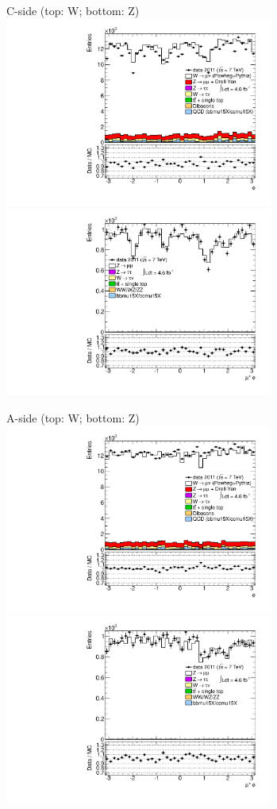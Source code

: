{

\colb[T]

C-side (top: W; bottom: Z)
\centering
\includegraphics[width=0.66\textwidth]{dates/20130306/figures/etaphi/W_10_C_stack_l_phi_POS} \\
\includegraphics[width=0.66\textwidth]{dates/20130306/figures/etaphi/Z_10_C_stack_lP_phi_ALL.pdf}

A-side (top: W; bottom: Z)
\centering
\includegraphics[width=0.66\textwidth]{dates/20130306/figures/etaphi/W_10_A_stack_l_phi_POS} \\
\includegraphics[width=0.66\textwidth]{dates/20130306/figures/etaphi/Z_10_A_stack_lP_phi_ALL.pdf} 

\cole
}


